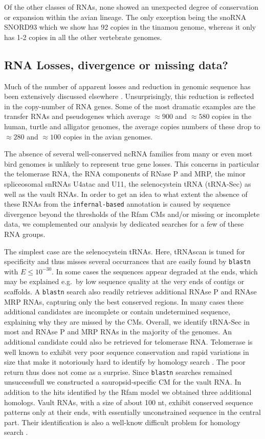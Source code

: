\documentclass[10pt]{bmc_article}
\newenvironment{bmcformat}{\begin{raggedright}\baselineskip20pt\sloppy\setboolean{publ}{false}}{\end{raggedright}\baselineskip20pt\sloppy}
\begin{document}
\begin{bmcformat}
Of the other classes of RNAs, none showed an unexpected degree of
conservation or expansion within the avian lineage. The only exception
being the snoRNA SNORD93 which we show has 92 copies in the tinamou
genome, whereas it only has 1-2 copies in all the other vertebrate
genomes. 

\subsection*{RNA Losses, divergence or missing data?}

Much of the number of apparent losses and reduction in genomic
sequence has been extensively discussed elsewhere
\cite{Organ:2007}. Unsurprisingly, this reduction is reflected in the
copy-number of RNA genes. Some of the most dramatic examples are the
transfer RNAs and pseudogenes which average $\approx 900$ and $\approx
580$ copies in the human, turtle and alligator genomes, the average
copies numbers of these drop to $\approx 280$ and $\approx 100$ copies
in the avian genomes. 

The absence of several well-conserved ncRNA families from many or even most
bird genomes is unlikely to represent true gene losses. This concerns in
particular the telomerase RNA, the RNA components of RNase P and MRP, the
minor spliceosomal snRNAs U4atac and U11, the selenocystein tRNA (tRNA-Sec)
as well as the vault RNAs. In order to get an idea to what extent the
absence of these RNAs from the \texttt{infernal-based} annotation is caused 
by sequence divergence beyond the thresholds of the Rfam CMs and/or 
missing or incomplete data, we complemented our analysis by dedicated
searches for a few of these RNA groups. 

The simplest case are the selenocystein tRNAs. Here, tRNAscan is tuned for
specificity and thus misses several occurrances that are easily found by
\texttt{blastn} with $E\le 10^{-30}$. In some cases the sequences appear
degraded at the ends, which may be explained e.g.\ by low sequence quality
at the very ends of contigs or scaffolds. A \texttt{blastn} search also
readily retrieves additional RNAse P and RNAse MRP RNAs, capturing only the
best conserved regions. In many cases these additional candidates are
incomplete or contain undetermined sequence, explaining why they are missed
by the CMs. Overall, we identify tRNA-Sec in most and RNAse P and MRP RNAs
in the majority of the genomes. An additional candidate could also be
retrieved for telomerase RNA. Telomerase is well known to exhibit very poor
sequence conservation and rapid variations in size that make it notoriously
hard to identify by homology search \cite{Xie:08a}. The poor return thus
does not come as a surprise. Since \texttt{blastn} searches remained
unsuccessfull we constructed a sauropsid-specific CM for the vault RNA. In
addition to the hits identified by the Rfam model we obtained three
additional homologs. Vault RNAs, with a size of about 100 nt, exhibit
conserved sequence patterns only at their ends, with essentially
unconstrained sequence in the central part. Their identification is also a
well-know difficult problem for homology search
\cite{Stadler:09b}. 


\end{bmcformat}
\end{document}
